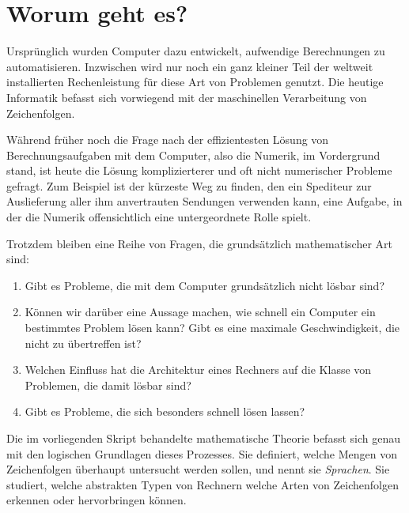 %
%
%
\rhead{}
\chapter*{Worum geht es?\label{chapter-intro}}
Ursprünglich wurden Computer dazu entwickelt, aufwendige
Berechnungen zu automatisieren. Inzwischen wird nur noch ein
ganz kleiner Teil der weltweit installierten Rechenleistung für
diese Art von Problemen genutzt. 
Die heutige Informatik befasst sich vorwiegend mit der maschinellen
Verarbeitung von Zeichenfolgen. 

Während früher noch die Frage nach der effizientesten Lösung von
Berechnungsaufgaben mit dem Computer, also die Numerik, im Vordergrund stand,  
ist heute die Lösung komplizierterer und oft nicht numerischer Probleme 
gefragt. Zum Beispiel ist der kürzeste Weg zu finden, den ein Spediteur
zur Auslieferung aller ihm anvertrauten Sendungen verwenden kann, eine
Aufgabe, in der die Numerik offensichtlich eine untergeordnete Rolle spielt.

Trotzdem bleiben eine Reihe von Fragen, die grundsätzlich mathematischer
Art sind:
\begin{enumerate}
\item Gibt es Probleme, die mit dem Computer grundsätzlich nicht
lösbar sind?
\item Können wir darüber eine Aussage machen, wie schnell ein Computer
ein bestimmtes Problem lösen kann? Gibt es eine maximale Geschwindigkeit,
die nicht zu übertreffen ist?
\item Welchen Einfluss hat die Architektur eines Rechners auf die Klasse
von Problemen, die damit lösbar sind?
\item Gibt es Probleme, die sich besonders schnell lösen lassen?
\end{enumerate}
Die im vorliegenden Skript behandelte mathematische Theorie befasst sich
genau mit den logischen Grundlagen dieses Prozesses.
Sie definiert, welche Mengen von Zeichenfolgen überhaupt untersucht
werden sollen, und nennt sie {\em Sprachen}.
Sie studiert, welche abstrakten Typen von
Rechnern welche Arten von Zeichenfolgen erkennen oder hervorbringen
können. 

